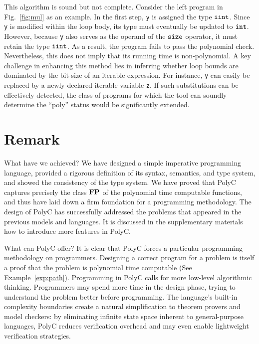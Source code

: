 \documentclass[runningheads]{llncs}
\begin{document}
This algorithm is sound but not complete.
Consider the left program in Fig.~\ref{fig:mul} as an example.
In the first step, \texttt{y} is assigned the type $\mathtt{iint}$.
Since \texttt{y} is modified within the loop body, its type must eventually be updated to $\mathtt{int}$.
However, because \texttt{y} also serves as the operand of the $\mathtt{size}$ operator, it must retain the type $\mathtt{iint}$.
As a result, the program fails to pass the polynomial check.
Nevertheless, this does not imply that its running time is non-polynomial.
A key challenge in enhancing this method lies in inferring whether loop bounds are dominated by the bit-size of an iterable expression. 
For instance, \texttt{y} can easily be replaced by a newly declared iterable variable \texttt{z}.
If such substitutions can be effectively detected, the class of programs for which the tool can soundly determine the ``poly'' status would be significantly extended.
\section{Remark}\label{sec:conclusion}
What have we achieved?
We have designed a simple imperative programming language, provided a rigorous definition of its syntax, semantics, and type system, and showed the consistency of the type system.
We have proved that PolyC captures precisely the class $\mathbf{FP}$ of the polynomial time computable functions, and thus have laid down a firm foundation for a programming methodology.
The design of {PolyC} has successfully addressed the problems that appeared in the previous models and languages. 
It is discussed in the supplementary materials how to introduce more features in {PolyC}.

What can {PolyC} offer?
It is clear that PolyC forces a particular programming methodology on programmers.
Designing a correct program for a problem is itself a proof that the problem is polynomial time computable (See Example~\ref{exp:path}).
Programming in PolyC calls for more low-level algorithmic thinking.
Programmers may spend more time in the design phase, trying to understand the problem better before programming.
The language's built-in complexity boundaries create a natural simplification to theorem provers and model checkers: by eliminating infinite state space inherent to general-purpose languages, PolyC reduces verification overhead and may even enable lightweight verification strategies.
\end{document}
